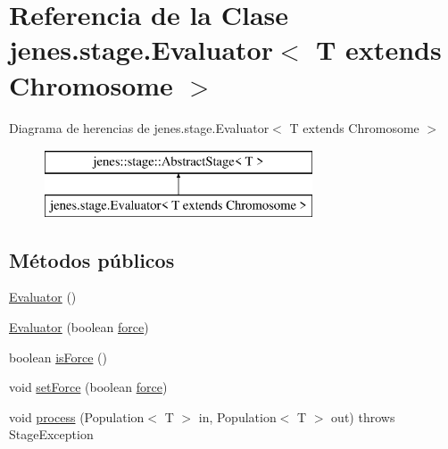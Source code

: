 \hypertarget{classjenes_1_1stage_1_1_evaluator_3_01_t_01extends_01_chromosome_01_4}{\section{Referencia de la Clase jenes.\-stage.\-Evaluator$<$ T extends Chromosome $>$}
\label{classjenes_1_1stage_1_1_evaluator_3_01_t_01extends_01_chromosome_01_4}
}
Diagrama de herencias de jenes.\-stage.\-Evaluator$<$ T extends Chromosome $>$\begin{figure}[H]
\begin{center}
\leavevmode
\includegraphics[height=2.000000cm]{classjenes_1_1stage_1_1_evaluator_3_01_t_01extends_01_chromosome_01_4}
\end{center}
\end{figure}
\subsection*{Métodos públicos}
\begin{DoxyCompactItemize}
\item 
\hyperlink{classjenes_1_1stage_1_1_evaluator_3_01_t_01extends_01_chromosome_01_4_afe7302209d1e39a0267bf4320d6d298d}{Evaluator} ()
\item 
\hyperlink{classjenes_1_1stage_1_1_evaluator_3_01_t_01extends_01_chromosome_01_4_ad156e40a9579040474e6720f14c49919}{Evaluator} (boolean \hyperlink{classjenes_1_1stage_1_1_evaluator_3_01_t_01extends_01_chromosome_01_4_a8ad6c1bcd555e06450a444d2d18b6b89}{force})
\item 
boolean \hyperlink{classjenes_1_1stage_1_1_evaluator_3_01_t_01extends_01_chromosome_01_4_a617f44ce8de8d0e4bab8506e81038e76}{is\-Force} ()
\item 
void \hyperlink{classjenes_1_1stage_1_1_evaluator_3_01_t_01extends_01_chromosome_01_4_acd9d554678a83708eeb2d373def60e71}{set\-Force} (boolean \hyperlink{classjenes_1_1stage_1_1_evaluator_3_01_t_01extends_01_chromosome_01_4_a8ad6c1bcd555e06450a444d2d18b6b89}{force})
\item 
void \hyperlink{classjenes_1_1stage_1_1_evaluator_3_01_t_01extends_01_chromosome_01_4_a25aee75f7acf2406ca17526f588a8f15}{process} (Population$<$ T $>$ in, Population$<$ T $>$ out)  throws Stage\-Exception 
\end{DoxyCompactItemize}
